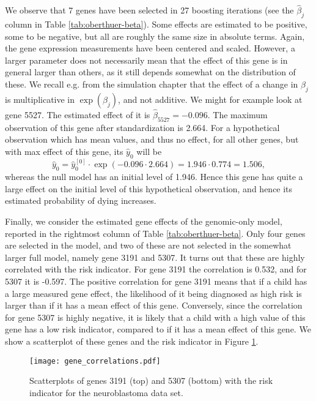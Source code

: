 We observe that 7 genes have been selected in 27 boosting iterations (see the $\hat{\beta}_j$ column in Table \ref{tab:oberthuer-beta}).
Some effects are estimated to be positive, some to be negative, but all are roughly the same size in absolute terms.
Again, the gene expression measurements have been centered and scaled.
However, a larger parameter does not necessarily mean that the effect of this gene is in general larger than others, as it still depends somewhat on the distribution of these.
We recall e.g. from the simulation chapter that the effect of a change in $\beta_j$ is multiplicative in $\exp(\beta_j)$, and not additive.
We might for example look at gene 5527.
The estimated effect of it is $\hat{\beta}_{5527}=-0.096$.
The maximum observation of this gene after standardization is 2.664.
For a hypothetical observation which has mean values, and thus no effect, for all other genes, but with max effect of this gene, its $\hat{y}_{0}$ will be
\begin{equation*}
    \hat{y}_{0}=\hat{y}_0^{[0]}\cdot\exp(-0.096\cdot2.664)=1.946\cdot0.774=1.506,
\end{equation*}
whereas the null model has an initial level of 1.946.
Hence this gene has quite a large effect on the initial level of this hypothetical observation, and hence its estimated probability of dying increases.

Finally, we consider the estimated gene effects of the genomic-only model, reported in the rightmost column of Table \ref{tab:oberthuer-beta}.
Only four genes are selected in the model, and two of these are not selected in the somewhat larger full model, namely gene 3191 and 5307.
It turns out that these are highly correlated with the risk indicator.
For gene 3191 the correlation is 0.532, and for 5307 it is -0.597.
The positive correlation for gene 3191 means that if a child has a large measured gene effect, the likelihood of it being diagnosed as high risk is larger than if it has a mean effect of this gene.
Conversely, since the correlation for gene 5307 is highly negative, it is likely that a child with a high value of this gene has a low risk indicator, compared to if it has a mean effect of this gene.
We show a scatterplot of these genes and the risk indicator in Figure \ref{fig:gene-corr}.

\begin{figure}
\caption{Scatterplots of genes 3191 (top) and 5307 (bottom) with the risk indicator for the neuroblastoma data set.}
\label{fig:gene-corr}
\centering\texttt{[image: gene\_correlations.pdf]}
\end{figure}


